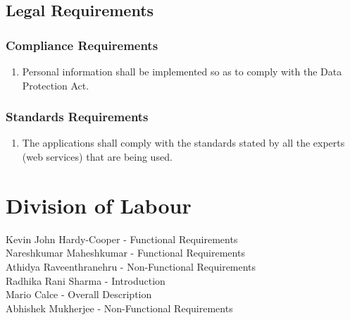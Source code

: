 \documentclass[]{article}
\begin{document}
\subsection{Legal Requirements}
\label{sub:legal_requirements}

\subsubsection{Compliance Requirements}
\label{ssub:compliance_requirements}
\begin{enumerate}[{LR}1. ]
	\item Personal information shall be implemented so as to comply with the
	Data Protection Act.
\end{enumerate}

\subsubsection{Standards Requirements}
\label{ssub:standards_requirements}
\begin{enumerate}[{LR}2. ]
	\item The applications shall comply with the standards stated by all the experts (web services) that are being used.
\end{enumerate}



\appendix
\section{Division of Labour}
\label{sec:division_of_labour}
Kevin John Hardy-Cooper - Functional Requirements\\
Nareshkumar Maheshkumar - Functional Requirements\\
Athidya Raveenthranehru - Non-Functional Requirements\\
Radhika Rani Sharma - Introduction\\
Mario Calce - Overall Description\\
Abhishek Mukherjee - Non-Functional Requirements\\
\end{document}
